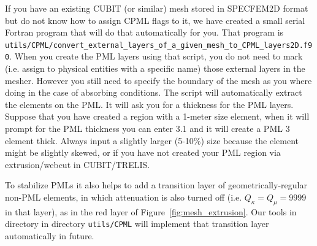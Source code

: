 If you have an existing CUBIT (or similar) mesh stored in SPECFEM2D
format but do not know how to assign CPML flags to it,
we have created a small serial Fortran program that will do that automatically for you.
That program is \texttt{utils/CPML/convert\_external\_layers\_of\_a\_given\_mesh\_to\_CPML\_layers2D.f90}.
When you create the PML layers using that script, you do not need to mark
(i.e. assign to physical entities with a specific name) those external layers in the mesher.
However you still need to specify the boundary of the mesh as you where doing in the case of absorbing conditions.
The script will automatically extract the elements on the PML. It will ask you for a thickness for the PML layers.
Suppose that you have created a region with a 1-meter size element, when it will prompt for the PML thickness
you can enter 3.1 and it will create a PML 3 element thick. Always input a slightly larger (5-10\%) size because the element might be slightly skewed,
or if you have not created your PML region via extrusion/webcut in CUBIT/TRELIS.\newline

To stabilize PMLs it also helps to add a transition layer of geometrically-regular non-PML elements, in which attenuation is also
turned off (i.e. $Q_\kappa = Q_\mu = 9999$ in that layer), as in the red layer of Figure~\ref{fig:mesh_extrusion}.
Our tools in directory in directory \texttt{utils/CPML} will implement that transition layer automatically in future.\newline

